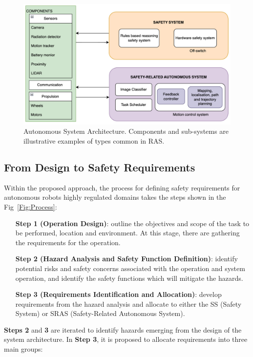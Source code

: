 \documentclass[conference]{IEEEtran}
\newcommand{\marienote}[1]{\todo[color=orange!65,inline]{Marie: #1}}
\begin{document}
\begin{figure}[t]
    \centerline{\includegraphics[scale=0.26]{SystArchitecture.png}}
    \caption{Autonomous System Architecture. Components and sub-systems are illustrative examples of types common in RAS.
    }
    \label{Fig:SArchitecture}
\end{figure}


\subsection{From Design to Safety Requirements}
\label{sec:HazardAnalisys}
Within the proposed approach, the process for defining safety requirements for autonomous robots highly regulated domains takes the steps shown in the Fig~\ref{Fig:Process}:


\begin{enumerate}
    \item[\textbf{Step 1 (Operation Design)}:] outline the objectives and scope of the task to be performed, location and environment. At this stage, there are gathering the requirements for the operation. 
    \item[ \textbf{Step 2 (Hazard  Analysis and Safety Function Definition)}:] identify potential risks and safety concerns associated with the operation and system operation, and identify the safety functions which will mitigate the hazards.
    \item[\textbf{Step 3 (Requirements Identification and Allocation)}:] develop requirements from the hazard analysis and allocate to either the SS (Safety System) or SRAS (Safety-Related Autonomous System).
\end{enumerate}
\textbf{Steps 2} and \textbf{3} are iterated to identify hazards emerging from the design of the system architecture. In \textbf{Step 3}, it is proposed to allocate requirements into three main groups:
\end{document}
